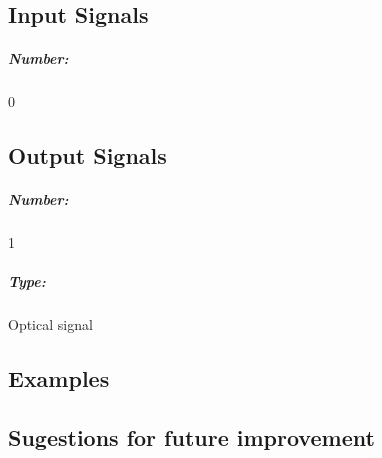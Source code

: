 \documentclass[a4paper]{article}
\begin{document}
\pagebreak
\subsection*{Input Signals}

\subparagraph*{Number:} 0

\subsection*{Output Signals}

\subparagraph*{Number:} 1

\subparagraph*{Type:} Optical signal

\subsection*{Examples} 

\subsection*{Sugestions for future improvement}
\end{document}
